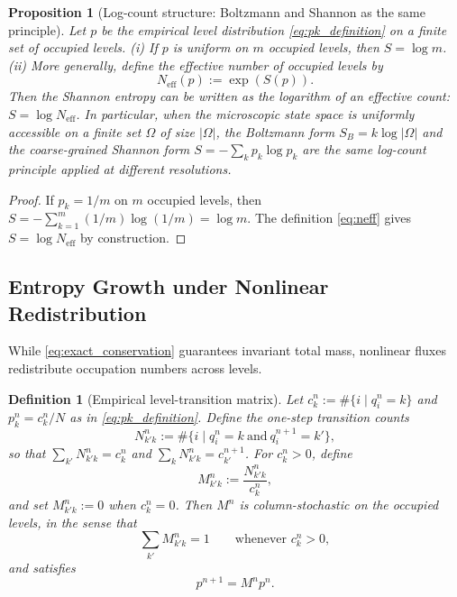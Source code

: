 \documentclass[sn-basic]{sn-jnl}
\theoremstyle{plain}
\newtheorem{proposition}[theorem]{Proposition}
\newtheorem{definition}[theorem]{Definition}
\theoremstyle{remark}
\begin{document}
\begin{proposition}[Log-count structure: Boltzmann and Shannon as the same principle]
\label{prop:log_count}
Let $p$ be the empirical level distribution \cref{eq:pk_definition} on a finite set of occupied levels.
(i) If $p$ is uniform on $m$ occupied levels, then $S=\log m$.
(ii) More generally, define the \emph{effective number of occupied levels} by
\begin{equation}
N_{\mathrm{eff}}(p):=\exp(S(p)).
\label{eq:neff}
\end{equation}
Then the Shannon entropy can be written as the logarithm of an effective count: $S=\log N_{\mathrm{eff}}$.
In particular, when the microscopic state space is uniformly accessible on a finite set $\Omega$ of size $|\Omega|$, the Boltzmann form $S_B = k\log|\Omega|$ and the coarse-grained Shannon form $S= -\sum_k p_k\log p_k$ are the same log-count principle applied at different resolutions.
\end{proposition}

\begin{proof}
If $p_k=1/m$ on $m$ occupied levels, then $S=-\sum_{k=1}^m (1/m)\log(1/m)=\log m$.
The definition \cref{eq:neff} gives $S=\log N_{\mathrm{eff}}$ by construction.
\end{proof}

\subsection*{Entropy Growth under Nonlinear Redistribution}
\label{subsec:entropy_growth}

While \cref{eq:exact_conservation} guarantees invariant total mass, nonlinear fluxes redistribute occupation numbers across levels.

\begin{definition}[Empirical level-transition matrix]
\label{def:level_transition}
Let $c_k^n := \#\{ i \mid q_i^n = k \}$ and $p_k^n=c_k^n/N$ as in \cref{eq:pk_definition}. Define the one-step transition counts
\[
N_{k'k}^n := \#\{ i \mid q_i^n = k\ \text{and}\ q_i^{n+1}=k' \},
\]
so that $\sum_{k'} N_{k'k}^n = c_k^n$ and $\sum_k N_{k'k}^n = c_{k'}^{n+1}$. For $c_k^n>0$, define
\begin{equation}
M_{k'k}^n := \frac{N_{k'k}^n}{c_k^n},
\label{eq:empirical_M}
\end{equation}
and set $M_{k'k}^n:=0$ when $c_k^n=0$. Then $M^n$ is column-stochastic on the occupied levels, in the sense that
\[
\sum_{k'} M_{k'k}^n = 1 \qquad \text{whenever } c_k^n>0,
\]
and satisfies
\begin{equation}
p^{n+1} = M^n p^n.
\label{eq:pn1_equals_Mpn}
\end{equation}
\end{definition}
\end{document}
